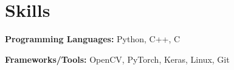 \documentclass[letterpaper,11pt]{article}
\makeatletter
\newcommand{\JobSubheading}[4]{
  \vspace{-1pt}
    \begin{tabular*}{\textwidth}[t]{l@{\extracolsep{\fill}}r}
      \textbf {#1} & \textit{#2}  \\
      \textit{#3} & \textit{#4} \\
    \end{tabular*}\vspace{-5pt}
}
\makeatother
\begin{document}
    \begin{comment}

    \JobSubheading
      {Graduate Research Assistant}{Aug 2015 - Dec 2016}
      {ECE Department, The University of Texas at Austin}{Austin, TX}
      \vspace{-1pt}
      \begin{itemize}
        \item Researched full-duplex radio as part of a 4 person pre-startup team. Ported MATLAB to C
      \end{itemize}
    \vspace{-2pt}
    
    \JobSubheading
      {Pharos Lab, The University of Texas at Austin}{Austin, TX}
      {Lab Assistant}{Jan 2014 - May 2014}
      \vspace{0pt}
      \begin{itemize}
        \item Helped setup robots in Linux and ROS
      \end{itemize}
    
    \JobSubheading
      {Sanger Learning Center, The University of Texas at Austin}{Austin, TX}
      {Undergraduate Tutor}{Sep 2013 - Sep 2014}
      \vspace{0pt}
      \begin{itemize}
        \item Tutored peers in Calculus and French
      \end{itemize}
      
    \end{comment}
      

\section{\color{BlueViolet} Skills}

      \small \textbf{Programming Languages:} Python, C++, C
      \vspace{1pt}
      
      \textbf{Frameworks/Tools:} OpenCV, PyTorch, Keras, Linux, Git
      \vspace{1pt}
\end{document}
